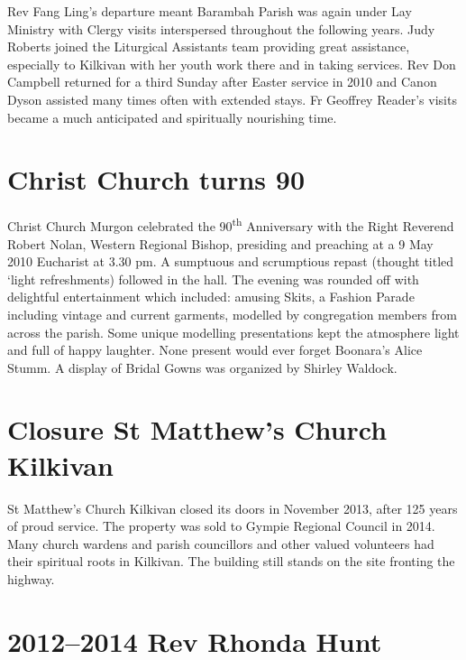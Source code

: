 Rev Fang Ling's departure meant Barambah Parish was again under Lay Ministry with Clergy visits interspersed throughout the following years. Judy Roberts joined the Liturgical Assistants team providing great assistance, especially to Kilkivan with her youth work there and in taking services. Rev Don Campbell returned for a third Sunday after Easter service in 2010 and Canon Dyson assisted many times often with extended stays. Fr Geoffrey Reader's visits became a much anticipated and spiritually nourishing time.



\section{Christ Church turns 90}



Christ Church Murgon celebrated the 90\textsuperscript{th} Anniversary with the Right Reverend Robert Nolan, Western Regional Bishop, presiding and preaching at a 9 May 2010 Eucharist at 3.30 pm. A sumptuous and scrumptious repast (thought titled `light refreshments) followed in the hall. The evening was rounded off with delightful entertainment which included: amusing Skits, a Fashion Parade including vintage and current garments, modelled by congregation members from across the parish. Some unique modelling presentations kept the atmosphere light and full of happy laughter. None present would ever forget Boonara's Alice Stumm. A display of Bridal Gowns was organized by Shirley Waldock.



\section{Closure St Matthew's Church Kilkivan}



St Matthew's Church Kilkivan closed its doors in November 2013, after 125 years of proud service. The property was sold to Gympie Regional Council in 2014. Many church wardens and parish councillors and other valued volunteers had their spiritual roots in Kilkivan. The building still stands on the site fronting the highway.



\section{2012--2014 Rev Rhonda Hunt}



